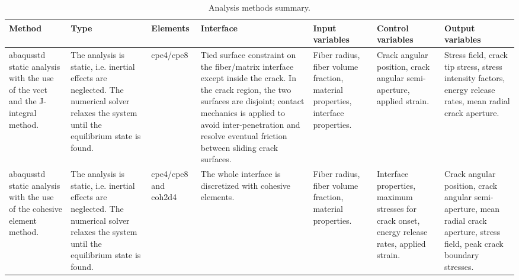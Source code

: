 \begin{sidewaystable}[htbp]
\footnotesize
  \centering
  \caption{Analysis methods summary.}
    \begin{tabularx}{\textwidth}{XXXXXXX}
    \toprule
  \textbf{Method}&  \textbf{Type}&\textbf{Elements}&\textbf{Interface}&\textbf{Input variables}&\textbf{Control variables}&\textbf{Output variables} \\
    \midrule
    \gls{abaqusstd} static analysis with the use of the \acrshort{vcct} and the J-integral method.&The analysis is static, i.e. inertial effects are neglected. The numerical solver relaxes the system until the equilibrium state is found.&\gls{cpe4}/\gls{cpe8}&Tied surface constraint on the fiber/matrix interface except inside the crack. In the crack region, the two surfaces are disjoint; contact mechanics is applied to avoid inter-penetration and resolve eventual friction between sliding crack surfaces.&Fiber radius, fiber volume fraction, material properties, interface properties.&Crack angular position, crack angular semi-aperture, applied strain.&Stress field, crack tip stress, stress intensity factors, energy release rates, mean radial crack aperture.\\
\midrule
\gls{abaqusstd} static analysis with the use of the cohesive element method.&The analysis is static, i.e. inertial effects are neglected. The numerical solver relaxes the system until the equilibrium state is found.&\gls{cpe4}/\gls{cpe8} and \gls{coh2d4}&The whole interface is discretized with cohesive elements.&Fiber radius, fiber volume fraction, material properties.&Interface properties, maximum stresses for crack onset, energy release rates, applied strain.&Crack angular position, crack angular semi-aperture, mean radial crack aperture, stress field, peak crack boundary stresses.\\
    \bottomrule
    \end{tabularx}%
  \label{tab:analysis_tab}%
\end{sidewaystable}%
